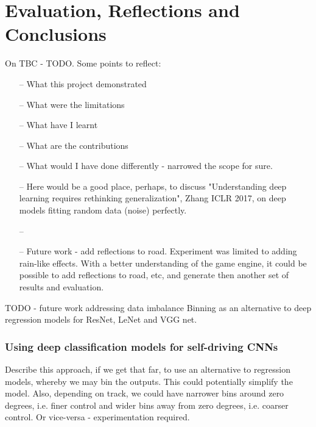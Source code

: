 
\chapter{Evaluation, Reflections and Conclusions}

\label{Eval} 


On
TBC - TODO. Some points to reflect:
\begin{itemize}
    \item[--] What this project demonstrated
    \item[--] What were the limitations
    \item[--] What have I learnt
    \item[--] What are the contributions
    \item[--] What would I have done differently - narrowed the scope for sure.
    \item[--] Here would be a good place, perhaps, to discuss "Understanding deep learning requires rethinking generalization", Zhang ICLR 2017, on deep models fitting random data (noise) perfectly. 
    \item[--] 
    \item[--] Future work - add reflections to road. Experiment was limited to adding rain-like effects. With a better understanding of the game engine, it could be possible to add reflections to road, etc, and generate then another set of results and evaluation.
\end{itemize}
TODO - future work
addressing data imbalance
Binning as an alternative to deep regression models for ResNet, LeNet and VGG net. 
\subsection{Using deep classification models for self-driving CNNs} %
Describe this approach, if we get that far, to use an alternative to regression models, whereby we may bin the outputs. This could potentially simplify the model. Also, depending on track, we could have narrower bins around zero degrees, i.e. finer control and wider bins away from zero degrees, i.e. coarser control. Or vice-versa - experimentation required.
